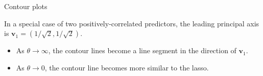 \documentclass[8pt]{beamer}
\begin{document}
\begin{frame}{Contour plots}

\begin{center}
    \centering
    \textcolor{white}{}
    \textcolor{white}{}
\end{center}

In a special case of two positively-correlated predictors, the leading principal axis is $\bm{v}_1 = (1/\sqrt{2}, 1/\sqrt{2})$.
\begin{itemize}
    \item As $\theta \to \infty$, the contour lines become a line segment in the direction of $\bm{v}_1$.
    \item As $\theta \to 0$, the contour line becomes more similar to the lasso.
\end{itemize}
    
\end{frame}
\end{document}
